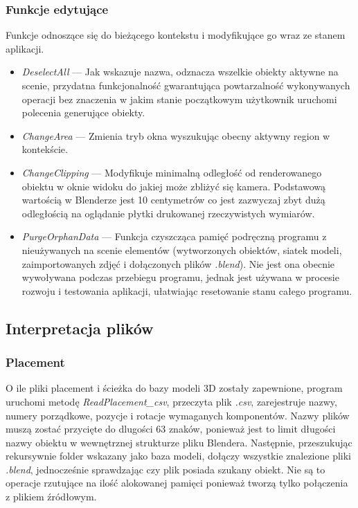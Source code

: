 \documentclass[brudnopis]{xmgr}
\begin{document}
\subsubsection{Funkcje edytujące}
Funkcje odnoszące się do bieżącego kontekstu i modyfikujące go wraz ze stanem aplikacji.
\begin{itemize}
\item \emph{DeselectAll} --- Jak wskazuje nazwa, odznacza wszelkie obiekty aktywne na scenie, przydatna funkcjonalność gwarantująca powtarzalność wykonywanych operacji bez znaczenia w jakim stanie początkowym użytkownik uruchomi polecenia generujące obiekty.
\item \emph{ChangeArea} --- Zmienia tryb okna wyszukując obecny aktywny region w kontekście.
\item \emph{ChangeClipping} --- Modyfikuje minimalną odległość od renderowanego obiektu w oknie widoku do jakiej może zbliżyć się kamera. Podstawową wartością w Blenderze jest 10 centymetrów co jest zazwyczaj zbyt dużą odległością na oglądanie płytki drukowanej rzeczywistych wymiarów.
\item \emph{PurgeOrphanData} --- Funkcja czyszcząca pamięć podręczną programu z nieużywanych na scenie elementów (wytworzonych obiektów, siatek modeli, zaimportowanych zdjęć i dołączonych plików \emph{.blend}). Nie jest ona obecnie wywoływana podczas przebiegu programu, jednak jest używana w procesie rozwoju i testowania aplikacji, ułatwiając resetowanie stanu całego programu.
\end{itemize}
\subsection{Interpretacja plików}
\subsubsection{Placement}
O ile pliki placement i ścieżka do bazy modeli 3D zostały zapewnione, program uruchomi metodę \emph{ReadPlacement\_csv}, przeczyta plik \emph{.csv}, zarejestruje nazwy, numery porządkowe, pozycje i rotacje wymaganych komponentów. Nazwy plików muszą zostać przycięte do dlugości 63 znaków, ponieważ jest to limit długości nazwy obiektu w wewnętrznej strukturze pliku Blendera. Następnie, przeszukując rekursywnie folder wskazany jako baza modeli, dołączy wszystkie znalezione pliki \emph{.blend}, jednocześnie sprawdzając czy plik posiada szukany obiekt. Nie są to operacje rzutujące na ilość alokowanej pamięci ponieważ tworzą tylko połączenia z plikiem źródłowym.
\end{document}
